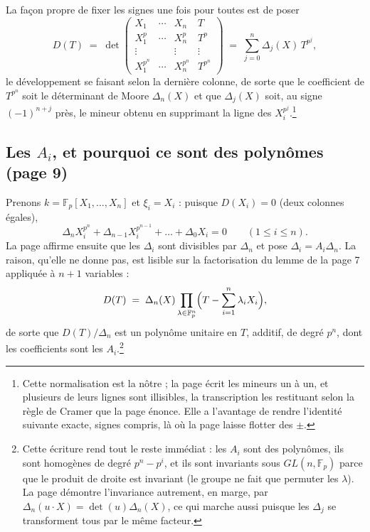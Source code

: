 \documentclass[11pt,a4paper]{article}
\begin{document}
La façon propre de fixer les signes une fois pour toutes est de poser
\[
  D(T) \;=\; \det\begin{pmatrix}
    X_1 & \cdots & X_n & T \\
    X_1^p & \cdots & X_n^p & T^p \\
    \vdots & & \vdots & \vdots \\
    X_1^{p^n} & \cdots & X_n^{p^n} & T^{p^n}
  \end{pmatrix}
  \;=\; \sum_{j=0}^{n} \Delta_j(X)\, T^{p^j} ,
\]
le développement se faisant selon la dernière colonne, de sorte que le
coefficient de $T^{p^n}$ soit le déterminant de Moore
$\Delta_n(X)$ et que $\Delta_j(X)$ soit, au signe $(-1)^{n+j}$ près, le
mineur obtenu en supprimant la ligne des $X_i^{p^j}$.\footnote{Cette
normalisation est la nôtre ; la page écrit les mineurs un à un, et plusieurs
de leurs lignes sont illisibles, la transcription les restituant selon la
règle de Cramer que la page énonce. Elle a l'avantage de rendre l'identité
suivante exacte, signes compris, là où la page laisse flotter des $\pm$.}

\subsection*{Les $A_i$, et pourquoi ce sont des polynômes (page 9)}

Prenons $k = \mathbb{F}_p[X_1, \dots, X_n]$ et $\xi_i = X_i$ : puisque
$D(X_i) = 0$ (deux colonnes égales),
\[
  \Delta_n X_i^{p^n} + \Delta_{n-1} X_i^{p^{n-1}} + \dots + \Delta_0 X_i = 0
  \qquad (1 \leqslant i \leqslant n) .
\]
La page affirme ensuite que les $\Delta_i$ sont divisibles par $\Delta_n$ et
pose $\Delta_i = A_i \Delta_n$. La raison, qu'elle ne donne pas, est
lisible sur la factorisation du lemme de la page 7 appliquée à $n+1$
variables :
\[
  D(T) \;=\; \Delta_n(X) \prod_{\lambda \in \mathbb{F}_p^n}
  \Bigl(T - \sum_{i=1}^n \lambda_i X_i\Bigr) ,
\]
de sorte que $D(T)/\Delta_n$ est un polynôme unitaire en $T$, additif, de
degré $p^n$, dont les coefficients sont les $A_i$.\footnote{Cette écriture
rend tout le reste immédiat : les $A_i$ sont
des polynômes, ils sont homogènes de degré $p^n - p^i$, et ils sont
invariants sous $GL(n, \mathbb{F}_p)$ parce que le produit de droite est
invariant (le groupe ne fait que permuter les $\lambda$). La page démontre
l'invariance autrement, en marge, par $\Delta_n(u \cdot X) = \det(u)
\Delta_n(X)$, ce qui marche aussi puisque les $\Delta_j$ se transforment tous
par le même facteur.}
\end{document}

